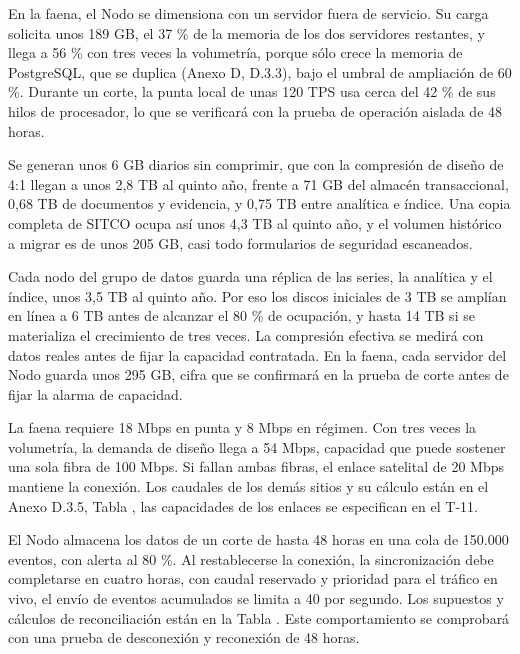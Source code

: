 \documentclass[subdoc]{../../comun/overfore}
\begin{document}
En la faena, el Nodo se dimensiona con un servidor fuera de servicio. Su carga solicita unos 189 GB, el 37 \% de la memoria de los dos servidores restantes, y llega a 56 \% con tres veces la volumetría, porque sólo crece la memoria de PostgreSQL, que se duplica (Anexo D, D.3.3), bajo el umbral de ampliación de 60 \%. Durante un corte, la punta local de unas 120 TPS usa cerca del 42 \% de sus hilos de procesador, lo que se verificará con la prueba de operación aislada de 48 horas.

Se generan unos 6 GB diarios sin comprimir, que con la compresión de diseño de 4:1 llegan a unos 2,8 TB al quinto año, frente a 71 GB del almacén transaccional, 0,68 TB de documentos y evidencia, y 0,75 TB entre analítica e índice. Una copia completa de SITCO ocupa así unos 4,3 TB al quinto año, y el volumen histórico a migrar es de unos 205 GB, casi todo formularios de seguridad escaneados.

Cada nodo del grupo de datos guarda una réplica de las series, la analítica y el índice, unos 3,5 TB al quinto año. Por eso los discos iniciales de 3 TB se amplían en línea a 6 TB antes de alcanzar el 80 \% de ocupación, y hasta 14 TB si se materializa el crecimiento de tres veces. La compresión efectiva se medirá con datos reales antes de fijar la capacidad contratada. En la faena, cada servidor del Nodo guarda unos 295 GB, cifra que se confirmará en la prueba de corte antes de fijar la alarma de capacidad.

La faena requiere 18 Mbps en punta y 8 Mbps en régimen. Con tres veces la volumetría, la demanda de diseño llega a 54 Mbps, capacidad que puede sostener una sola fibra de 100 Mbps. Si fallan ambas fibras, el enlace satelital de 20 Mbps mantiene la conexión. Los caudales de los demás sitios y su cálculo están en el Anexo D.3.5, Tabla , las capacidades de los enlaces se especifican en el T-11.

El Nodo almacena los datos de un corte de hasta 48 horas en una cola de 150.000 eventos, con alerta al 80 \%. Al restablecerse la conexión, la sincronización debe completarse en cuatro horas, con caudal reservado y prioridad para el tráfico en vivo, el envío de eventos acumulados se limita a 40 por segundo. Los supuestos y cálculos de reconciliación están en la Tabla . Este comportamiento se comprobará con una prueba de desconexión y reconexión de 48 horas.
\end{document}
